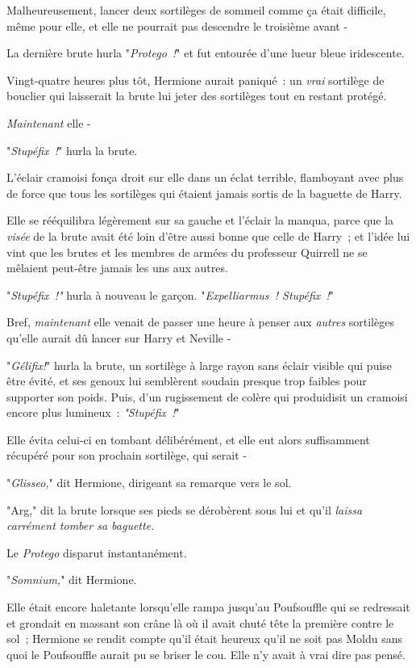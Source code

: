 Malheureusement, lancer deux sortilèges de sommeil comme ça était difficile, même pour elle, et elle ne pourrait pas descendre le troisième avant -

La dernière brute hurla "\emph{Protego~!}" et fut entourée d'une lueur bleue iridescente.

Vingt-quatre heures plus tôt, Hermione aurait paniqué~: un \emph{vrai} sortilège de bouclier qui laisserait la brute lui jeter des sortilèges tout en restant protégé.

\emph{Maintenant} elle -

"\emph{Stupéfix~!}" hurla la brute.

L'éclair cramoisi fonça droit sur elle dans un éclat terrible, flamboyant avec plus de force que tous les sortilèges qui étaient jamais sortis de la baguette de Harry.

Elle se rééquilibra légèrement sur sa gauche et l'éclair la manqua, parce que la \emph{visée} de la brute avait été loin d'être aussi bonne que celle de Harry~; et l'idée lui vint que les brutes et les membres de armées du professeur Quirrell ne se mêlaient peut-être jamais les uns aux autres.

"\emph{Stupéfix~!"} hurla à nouveau le garçon. "\emph{Expelliarmus~! Stupéfix~!}"

Bref, \emph{maintenant} elle venait de passer une heure à penser aux \emph{autres} sortilèges qu'elle aurait dû lancer sur Harry et Neville -

"\emph{Gélifix!}" hurla la brute, un sortilège à large rayon sans éclair visible qui puise être évité, et ses genoux lui semblèrent soudain presque trop faibles pour supporter son poids. Puis, d'un rugissement de colère qui produidisit un cramoisi encore plus lumineux~: \emph{"Stupéfix~!}"

Elle évita celui-ci en tombant délibérément, et elle eut alors suffisamment récupéré pour son prochain sortilège, qui serait -

"\emph{Glisseo,}" dit Hermione, dirigeant sa remarque vers le sol.

"Arg," dit la brute lorsque ses pieds se dérobèrent sous lui et qu'il \emph{laissa carrément tomber sa baguette.}

Le \emph{Protego} disparut instantanément.

"\emph{Somnium,}" dit Hermione.

Elle était encore haletante lorsqu'elle rampa jusqu'au Poufsouffle qui se redressait et grondait en massant son crâne là où il avait chuté tête la première contre le sol~; Hermione se rendit compte qu'il était heureux qu'il ne soit pas Moldu sans quoi le Poufsouffle aurait pu se briser le cou. Elle n'y avait à vrai dire pas pensé.

